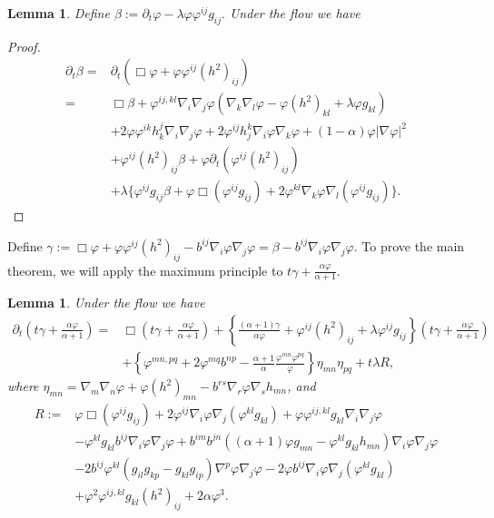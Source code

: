 \documentclass{amsart}
\newtheorem{lemma}[theorem]{Lemma}
\theoremstyle{definition}
\theoremstyle{remark}
\numberwithin{equation}{section}
\begin{document}
\begin{lemma}Define $\beta:=\partial_t\varphi-\lambda \varphi\varphi^{ij}g_{ij}.$ Under the flow we have
\end{lemma}
\begin{proof}
\begin{align*}
\partial_t\beta=&\partial_t(\Box \varphi+\varphi\varphi^{ij}(h^2)_{ij})\\
=&\Box\beta+\varphi^{ij,kl}\nabla_i\nabla_j\varphi(\nabla_k\nabla_l\varphi-\varphi(h^2)_{kl}+\lambda \varphi g_{kl})\\
&+2\varphi\varphi^{ik}h_k^j\nabla_i\nabla_j\varphi+2\varphi^{ij}h_j^k\nabla_i\varphi\nabla_k\varphi+(1-\alpha)\varphi|\nabla \varphi|^2\\
&+\varphi^{ij}(h^2)_{ij}\beta+\varphi\partial_t(\varphi^{ij}(h^2)_{ij})\\
&+\lambda\{\varphi^{ij}g_{ij}\beta+\varphi\Box(\varphi^{ij}g_{ij})+2\varphi^{kl}\nabla_k\varphi\nabla_l(\varphi^{ij}g_{ij})\}.
\end{align*}
\end{proof}
 Define $\gamma:=\Box \varphi+\varphi\varphi^{ij}(h^2)_{ij}-b^{ij}\nabla_i\varphi\nabla_j\varphi=\beta-b^{ij}\nabla_i\varphi\nabla_j\varphi.$ To prove the main theorem, we will apply the maximum principle to $t\gamma+\frac{\alpha\varphi}{\alpha+1}.$
\begin{lemma}Under the flow we have
\begin{align*}
\partial_t (t\gamma+\frac{\alpha\varphi}{\alpha+1})=&\Box (t\gamma+\frac{\alpha\varphi}{\alpha+1}) +\left\{\frac{(\alpha+1)\gamma}{\alpha\varphi}+\varphi^{ij}(h^2)_{ij}+\lambda\varphi^{ij}g_{ij}\right\}(t\gamma+\frac{\alpha\varphi}{\alpha+1})\\
&+\left\{\varphi^{mn,pq}+2\varphi^{mq}b^{np}-\frac{\alpha+1}{\alpha}\frac{\varphi^{mn}\varphi^{pq}}{\varphi}\right\}\eta_{mn}\eta_{pq}+t\lambda R,
\end{align*}
where $\eta_{mn}=\nabla_m\nabla_n\varphi+\varphi(h^2)_{mn}-b^{rs}\nabla_r\varphi\nabla_sh_{mn}$, and
\begin{align*}
R:=&\varphi\Box(\varphi^{ij}g_{ij})+2\varphi^{ij}\nabla_i\varphi\nabla_j(\varphi^{kl}g_{kl})+\varphi \varphi^{ij,kl}g_{kl}\nabla_i\nabla_j\varphi\\
&-\varphi^{kl}g_{kl}b^{ij}\nabla_i\varphi\nabla_j\varphi+b^{im}b^{jn}((\alpha+1)\varphi g_{mn}-\varphi^{kl}g_{kl}h_{mn})\nabla_i\varphi\nabla_j\varphi\\
&-2b^{ij}\varphi^{kl}(g_{il}g_{kp}-g_{kl}g_{ip})\nabla^p\varphi\nabla_j\varphi-2\varphi b^{ij}\nabla_i\varphi\nabla_j(\varphi^{kl}g_{kl})\\
&+\varphi^2\varphi^{ij,kl}g_{kl}(h^2)_{ij}+2\alpha\varphi^3.
\end{align*}
\end{lemma}

\begin{thebibliography}{10}
\end{thebibliography}
\end{document}
